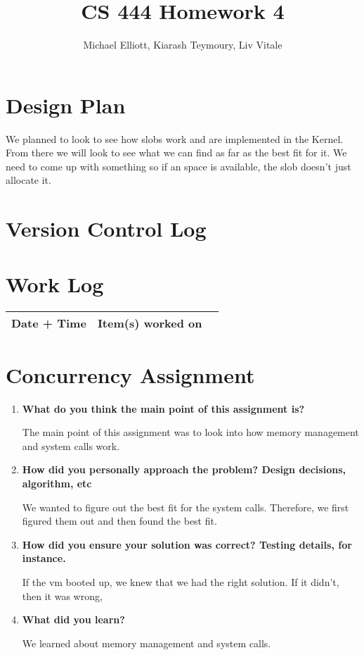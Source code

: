 \documentclass[letterpaper,10pt,titlepage,draftclsnofoot,onecolumn]{IEEEtran}
\title{CS 444 Homework 4}
\author{Michael Elliott, Kiarash Teymoury, Liv Vitale}
\begin{document}
\section{Design Plan}

\par We planned to look to see how slobs work and are implemented in the Kernel. From there we will 
look to see what we can find as far as the best fit for it. We need to come up with something so if an space is available, the slob doesn't just allocate it.

\section{Version Control Log}



\section{Work Log}
\begin{tabular}{l | c | r}
Date + Time & Item(s) worked on \\
\hline

\end{tabular}

\section{Concurrency Assignment}
\begin{enumerate}
\item \textbf{What do you think the main point of this assignment is?}

\par The main point of this assignment was to look into how memory management and system calls work.

\item \textbf{How did you personally approach the problem? Design decisions, algorithm, etc}

\par We wanted to figure out the best fit for the system calls. Therefore, we first figured them out and then found the best fit.

\item \textbf{How did you ensure your solution was correct? Testing details, for instance.}

\par If the vm booted up, we knew that we had the right solution. If it didn't, then it was wrong,

\item \textbf{What did you learn?}

\par We learned about memory management and system calls.

\end{enumerate}

\nocite{*}



\end{document}

